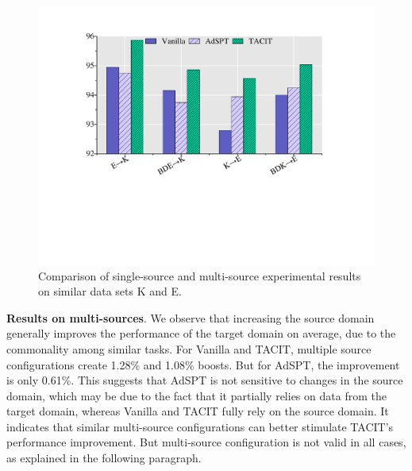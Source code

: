 \documentclass[letterpaper]{article} %
\begin{document}
\begin{figure}[t]
	\centering
	\includegraphics[width=0.9\columnwidth]{multi.pdf}
	\caption{Comparison of single-source and multi-source experimental results on similar data sets K and E.}
	\label{fig:multi}
\end{figure}

\textbf{Results on multi-sources}. We observe that increasing the source domain generally improves the performance of the target domain on average, due to the commonality among similar tasks. For Vanilla and TACIT, multiple source configurations create 1.28\% and 1.08\% boosts. But for AdSPT, the improvement is only 0.61\%. This suggests that AdSPT is not sensitive to changes in the source domain, which may be due to the fact that it partially relies on data from the target domain, whereas Vanilla and TACIT fully rely on the source domain. It indicates that similar multi-source configurations can better stimulate TACIT's performance improvement. But multi-source configuration is not valid in all cases, as explained in the following paragraph.
\end{document}
